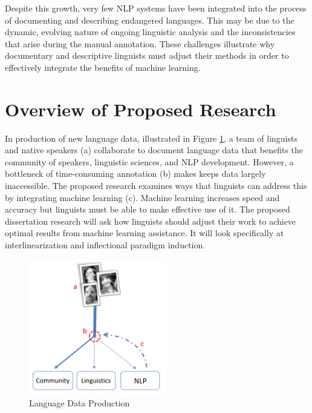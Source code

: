 Despite this growth, very few NLP systems have been integrated into the process of documenting and describing endangered languages. This may be due to the dynamic, evolving nature of ongoing linguistic analysis and the inconsistencies that arise during the manual annotation. These challenges illustrate why documentary and descriptive linguists must adjust their methods
in order to effectively integrate the benefits of machine learning.

\section{Overview of Proposed Research}

In production of new language data, illustrated in Figure \ref{fig:flowchart}, a team of linguists and native speakers (a) collaborate to document language data that benefits the community of speakers, linguistic sciences, and NLP development. However, a bottleneck of time-consuming annotation (b) makes keeps data largely inaccessible. The proposed research examines ways that linguists can address this by integrating machine learning (c). Machine learning increases %
speed and accuracy but linguists must be able to make effective use of it. The proposed dissertation research 
will ask how linguists should adjust their work to achieve optimal results from machine learning assistance. It will look specifically at interlinearization and inflectional paradigm induction.

\begin{figure}[h!]
\centering
\includegraphics[width=6cm]{figs/Flowchart.PNG}
\caption[Language Data Production]{Language Data Production}
\label{fig:flowchart}
\end{figure}


